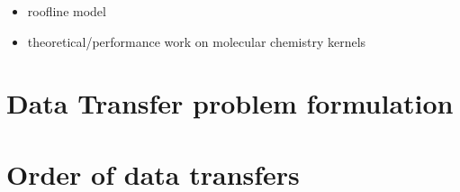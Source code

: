 \documentclass[runningheads]{llncs} %
\begin{document}
\begin{itemize}
	\item roofline model
	\item theoretical/performance work on molecular chemistry kernels
\end{itemize}

	\section{Data Transfer problem formulation}
	
	\section*{Order of data transfers}
	
\end{document}
